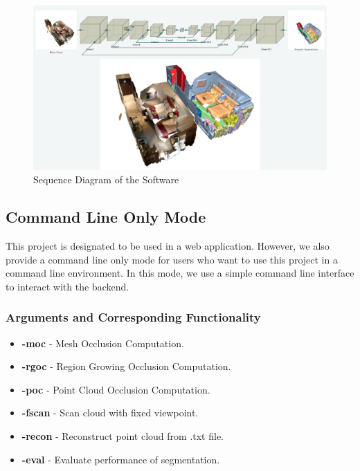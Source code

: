 \documentclass[11pt, a4paper,oneside,chapterprefix=false]{scrbook}
\begin{document}
\begin{minipage}{\textwidth}
    \begin{figure}[H]
        \centering
        \includegraphics*[width=1.0\textwidth]{figures/Minkowski Engine.png}
        \caption{Sequence Diagram of the Software}
        \label{fig:sequence diagram}
    \end{figure}
\end{minipage}

\subsection{Command Line Only Mode}

This project is designated to be used in a web application. However, we also provide a command line only mode for users who want to use this project in a command line environment. In this mode, we use a simple command line interface to interact with the backend.

\subsubsection{Arguments and Corresponding Functionality}

\begin{itemize}
	\item \textbf{-moc} - Mesh Occlusion Computation.
	\item \textbf{-rgoc} - Region Growing Occlusion Computation.
	\item \textbf{-poc} - Point Cloud Occlusion Computation.
	\item \textbf{-fscan} - Scan cloud with fixed viewpoint.
	\item \textbf{-recon} - Reconstruct point cloud from .txt file.
	\item \textbf{-eval} - Evaluate performance of segmentation.
\end{itemize}
\end{document}
